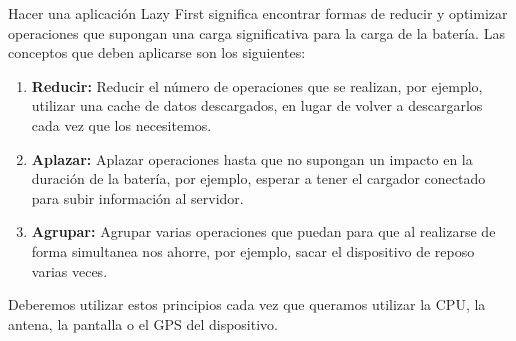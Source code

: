 
Hacer una aplicación Lazy First significa encontrar formas de
 reducir y optimizar operaciones que supongan una carga
 significativa para la carga de la batería. Las conceptos que 
deben aplicarse son los siguientes:
\begin{enumerate}
\item \textbf{Reducir:} Reducir el número de operaciones que 
se realizan, por ejemplo, utilizar una cache de datos descargados,
 en lugar de volver a descargarlos cada vez que los necesitemos.
\item \textbf{Aplazar:} Aplazar operaciones hasta que no supongan
 un impacto en la duración de la batería, por ejemplo, esperar a 
tener el cargador conectado para subir información al servidor.
\item \textbf{Agrupar:} Agrupar varias operaciones que puedan
 para que al realizarse de forma simultanea nos ahorre, por ejemplo,
 sacar el dispositivo de reposo varias veces.
\end{enumerate}

Deberemos utilizar estos principios cada vez que queramos utilizar
 la CPU, la antena, la pantalla o el GPS del dispositivo.